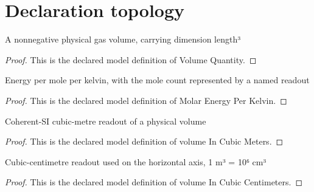 \section{Declaration topology}
\begin{definition}
  \label{def:physics:phyx-mini-0413:phyxminiproblems-problemphyxmini0413-volumequantity}
  A nonnegative physical gas volume, carrying dimension length³
\end{definition}
\begin{proof}
  This is the declared model definition of Volume Quantity.
\end{proof}
\begin{definition}
  \label{def:physics:phyx-mini-0413:phyxminiproblems-problemphyxmini0413-molarenergyperkelvin}
  Energy per mole per kelvin, with the mole count represented by a named readout
\end{definition}
\begin{proof}
  This is the declared model definition of Molar Energy Per Kelvin.
\end{proof}
\begin{definition}
  \label{def:physics:phyx-mini-0413:phyxminiproblems-problemphyxmini0413-volumeincubicmeters}
  Coherent-SI cubic-metre readout of a physical volume
\end{definition}
\begin{proof}
  This is the declared model definition of volume In Cubic Meters.
\end{proof}
\begin{definition}
  \label{def:physics:phyx-mini-0413:phyxminiproblems-problemphyxmini0413-volumeincubiccentimeters}
  Cubic-centimetre readout used on the horizontal axis, 1 m³ = 10⁶ cm³
\end{definition}
\begin{proof}
  This is the declared model definition of volume In Cubic Centimeters.
\end{proof}

